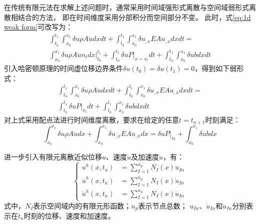 在传统有限元法在求解上述问题时，通常采用时间域强形式离散与空间域弱形式离散相结合的方法，
即在时间维度采用分部积分而空间部分不变。
此时，式\eqref{eq:1d weak form}可改写为：
\begin{multline}
    \int_{t_0}^{t_1} \int_{x_0}^{x_1} \delta u \rho A \ddot u dx dt + \int_{t_0}^{t_1} \int_{x_0}^{x_1} \delta u_{,x} EA u_{,x} dx dt = \\ 
    \int_{x_0}^{x_1} \delta u \rho A \dot u n_t dx \vert_{t_0}^{t_1}
    + \int_{t_0}^{t_1} \delta u P\vert_{x=x_t} dt + \int_{t_0}^{t_1} \int_{x_0}^{x_1} \delta u b dx dt
\end{multline}
引入哈密顿原理的时间虚位移边界条件$\delta u(t_0) = \delta u(t_1) = 0$，得到如下弱形式：
\begin{multline}
    \int_{t_0}^{t_1} \int_{x_0}^{x_1} \delta u \rho A \ddot u dx dt + \int_{t_0}^{t_1} \int_{x_0}^{x_1} \delta u_{,x} EA u_{,x} dx dt = \\ 
    \int_{t_0}^{t_1} \delta u P\vert_{x_t} dt + \int_{t_0}^{t_1} \int_{x_0}^{x_1} \delta u b dx dt
\end{multline}
对上式采用配点法进行时间维度离散，要求在给定的任意$t = t_{n+1}$时刻满足：
\begin{equation}\label{eq:1d_iter_weak_form}
    \int_{x_0}^{x_1} \delta u \rho A \ddot u dx + \int_{x_0}^{x_1} \delta u_{,x} EA u_{,x} dx = 
    \delta u P\vert_{x_t} + \int_{x_0}^{x_1} \delta u b dx 
\end{equation}

进一步引入有限元离散近似位移$u$、速度$\dot u$及加速度$\ddot u$，有：
\begin{equation}\label{eq:uh1D}
    \left \{ 
        \begin{aligned}
        u^h(x,t_n) &= \sum_{I=1}^{n_p} N_I(x) u_{In} \\
        \dot u^h(x,t_n) &= \sum_{I=1}^{n_p} N_I(x) \dot u_{In} \\
        \ddot u^h(x,t_n) &= \sum_{I=1}^{n_p} N_I(x) \ddot u_{In}
        \end{aligned}
    \right .
\end{equation}
式中，$N_I$表示空间域内的有限元形函数；$n_p$表示节点总数；
$u_{In}$、$\dot{u}_{In}$和$\ddot{u}_{In}$分别表示在$t_n$时刻的位移、速度和加速度。

